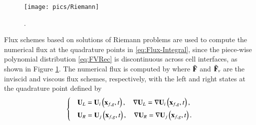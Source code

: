 \begin{figure}[htbp!]
    \centering
    \texttt{[image: pics/Riemann]}
    \caption{.}
    \label{fig:Riemann}
\end{figure}

Flux schemes based on solutions of Riemann problems are used to compute the numerical flux at the quadrature points in \eqref{eq:Flux-Integral}, since the piece-wise polynomial distribution \eqref{eq:FVRec} is discontinuous across cell interfaces, as shown in Figure \ref{fig:Riemann}.
The numerical flux is computed by
where $\tilde{\mathbf{F}}$ and $\tilde{\mathbf{F}}_v$ are the inviscid and viscous flux schemes, respectively, with the left and right states at the quadrature point defined by
\begin{equation}
    \begin{dcases}
         & \mathbf{U}_L= \mathbf{U}_i\left(\mathbf{x}_{f,g},t \right), \quad \nabla \mathbf{U}_L= \nabla \mathbf{U}_i\left(\mathbf{x}_{f,g},t \right),\\
         & \mathbf{U}_R= \mathbf{U}_j\left(\mathbf{x}_{f,g} ,t \right), \quad \nabla \mathbf{U}_R= \nabla \mathbf{U}_j\left(\mathbf{x}_{f,g},t \right).
    \end{dcases}
\end{equation}
